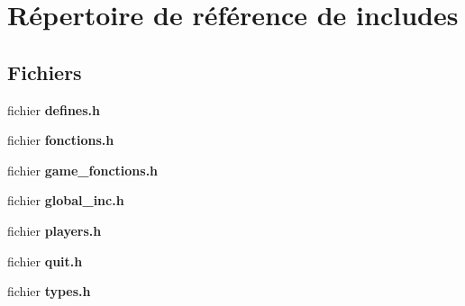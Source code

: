 \section{Répertoire de référence de includes}
\label{dir_018ac8b5b72195624cfd9ab35a533bac}
\subsection*{Fichiers}
\begin{DoxyCompactItemize}
\item 
fichier \textbf{ defines.\+h}
\item 
fichier \textbf{ fonctions.\+h}
\item 
fichier \textbf{ game\+\_\+fonctions.\+h}
\item 
fichier \textbf{ global\+\_\+inc.\+h}
\item 
fichier \textbf{ players.\+h}
\item 
fichier \textbf{ quit.\+h}
\item 
fichier \textbf{ types.\+h}
\end{DoxyCompactItemize}
